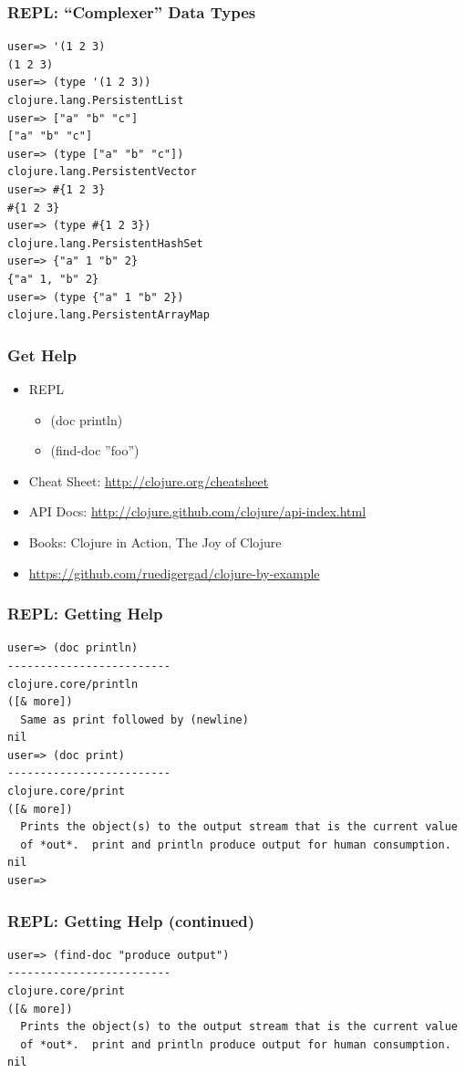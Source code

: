 \documentclass{beamer}
\begin{document}
\begin{frame}[fragile]
\frametitle{REPL: ``Complexer'' Data Types}
\begin{lstlisting}[basicstyle=\scriptsize]
user=> '(1 2 3)
(1 2 3)
user=> (type '(1 2 3))
clojure.lang.PersistentList
user=> ["a" "b" "c"]
["a" "b" "c"]
user=> (type ["a" "b" "c"])
clojure.lang.PersistentVector
user=> #{1 2 3}
#{1 2 3}
user=> (type #{1 2 3})
clojure.lang.PersistentHashSet
user=> {"a" 1 "b" 2}
{"a" 1, "b" 2}
user=> (type {"a" 1 "b" 2})
clojure.lang.PersistentArrayMap
\end{lstlisting}
\end{frame}

  \begin{frame}
      \frametitle{Get Help}

      \begin{itemize}
          \item REPL
              \begin{itemize}
                  \item (doc println)
                  \item (find-doc ''foo'')
              \end{itemize}
          \item Cheat Sheet: \url{http://clojure.org/cheatsheet}
          \item API Docs: \url{http://clojure.github.com/clojure/api-index.html}
          \item Books: Clojure in Action, The Joy of Clojure
          \item \url{https://github.com/ruedigergad/clojure-by-example}
      \end{itemize}
  \end{frame}

\begin{frame}[fragile]
\frametitle{REPL: Getting Help}
\begin{lstlisting}[basicstyle=\scriptsize]
user=> (doc println)
-------------------------
clojure.core/println
([& more])
  Same as print followed by (newline)
nil
user=> (doc print)
-------------------------
clojure.core/print
([& more])
  Prints the object(s) to the output stream that is the current value
  of *out*.  print and println produce output for human consumption.
nil
user=> 
\end{lstlisting}
\end{frame}

\begin{frame}[fragile]
\frametitle{REPL: Getting Help (continued)}
\begin{lstlisting}[basicstyle=\scriptsize]
user=> (find-doc "produce output")
-------------------------
clojure.core/print
([& more])
  Prints the object(s) to the output stream that is the current value
  of *out*.  print and println produce output for human consumption.
nil
\end{lstlisting}
\end{frame}
\end{document}
